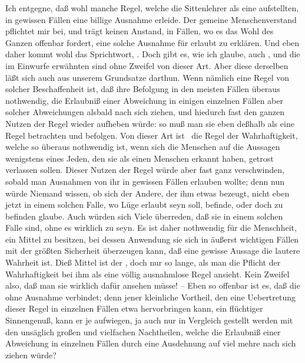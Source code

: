  Ich entgegne, daß wohl manche Regel, welche die Sittenlehrer als eine  aufstellten, in gewissen Fällen eine billige Ausnahme erleide. Der gemeine Menschenverstand pflichtet mir bei, und trägt keinen Anstand, in Fällen, wo es das Wohl des Ganzen offenbar fordert, eine solche Ausnahme für erlaubt zu erklären. Und eben daher kommt wohl das Sprichtwort, . Doch gibt es, wie ich glaube, auch , und die im Einwurfe erwähnten sind ohne Zweifel von dieser Art. Aber diese  derselben läßt sich auch aus unserem Grundsatze darthun. Wenn nämlich eine Regel von solcher Beschaffenheit ist, daß ihre Befolgung in den meisten Fällen überaus nothwendig, die Erlaubniß einer Abweichung in einigen einzelnen Fällen aber solcher Abweichungen alsbald  nach sich ziehen, und hiedurch fast den ganzen Nutzen der Regel wieder aufheben würde: so muß man sie eben deßhalb als eine  Regel betrachten und befolgen. Von dieser Art ist \zB\ die Regel der Wahrhaftigkeit, welche so überaus nothwendig ist, wenn sich die Menschen auf die Aussagen wenigstens eines Jeden, den sie als einen  Menschen erkannt haben, getrost verlassen sollen. Dieser Nutzen der Regel würde aber fast ganz verschwinden, sobald man Ausnahmen von ihr in gewissen Fällen erlauben wollte; denn nun würde Niemand wissen, ob sich der Andere, der ihm etwas bezeugt, nicht eben jetzt in einem solchen Falle, wo Lüge erlaubt seyn soll, befinde, oder doch zu befinden glaube. Auch würden sich Viele überreden, daß sie in einem solchen Falle sind, ohne es wirklich zu seyn. Es ist daher nothwendig für die Menschheit, ein Mittel zu besitzen, bei dessen Anwendung sie sich in äußerst wichtigen Fällen mit der größten Sicherheit überzeugen kann, daß eine gewisse Aussage die lautere Wahrheit ist. Dieß Mittel ist der , doch nur so lange, als man die Pflicht der Wahrhaftigkeit bei ihm als eine völlig ausnahmlose Regel ansieht. Kein Zweifel also, daß man sie wirklich dafür ansehen müsse! -- Eben so offenbar ist es, daß die  ohne Ausnahme verbindet; denn jener kleinliche Vortheil, den eine Uebertretung dieser Regel in einzelnen Fällen etwa hervorbringen kann, ein flüchtiger Sinnengenuß, kann er je aufwiegen, ja auch nur in Vergleich gestellt werden mit den unsäglich großen und vielfachen Nachtheilen, welche die Erlaubniß einer Abweichung in einzelnen Fällen durch eine Ausdehnung auf viel mehre nach sich ziehen würde? \usw\par
